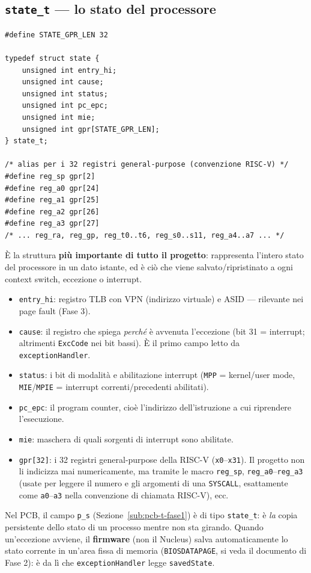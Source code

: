 \documentclass[11pt,a4paper]{article}
\newcommand{\code}[1]{\texttt{#1}}
\begin{document}
\subsection{\code{state\_t} --- lo stato del processore}
\begin{lstlisting}
#define STATE_GPR_LEN 32

typedef struct state {
    unsigned int entry_hi;
    unsigned int cause;
    unsigned int status;
    unsigned int pc_epc;
    unsigned int mie;
    unsigned int gpr[STATE_GPR_LEN];
} state_t;

/* alias per i 32 registri general-purpose (convenzione RISC-V) */
#define reg_sp gpr[2]
#define reg_a0 gpr[24]
#define reg_a1 gpr[25]
#define reg_a2 gpr[26]
#define reg_a3 gpr[27]
/* ... reg_ra, reg_gp, reg_t0..t6, reg_s0..s11, reg_a4..a7 ... */
\end{lstlisting}
\`E la struttura \textbf{più importante di tutto il progetto}: rappresenta
l'intero stato del processore in un dato istante, ed è ciò che viene
salvato/ripristinato a ogni context switch, eccezione o interrupt.
\begin{itemize}
\item \code{entry\_hi}: registro TLB con VPN (indirizzo virtuale) e ASID
  --- rilevante nei page fault (Fase 3).
\item \code{cause}: il registro che spiega \emph{perché} è avvenuta
  l'eccezione (bit 31 = interrupt; altrimenti \code{ExcCode} nei bit
  bassi). \`E il primo campo letto da \code{exceptionHandler}.
\item \code{status}: i bit di modalità e abilitazione interrupt
  (\code{MPP} = kernel/user mode, \code{MIE}/\code{MPIE} = interrupt
  correnti/precedenti abilitati).
\item \code{pc\_epc}: il program counter, cioè l'indirizzo dell'istruzione
  a cui riprendere l'esecuzione.
\item \code{mie}: maschera di quali sorgenti di interrupt sono abilitate.
\item \code{gpr[32]}: i 32 registri general-purpose della RISC-V
  (\code{x0}--\code{x31}). Il progetto non li indicizza mai numericamente,
  ma tramite le macro \code{reg\_sp}, \code{reg\_a0}--\code{reg\_a3}
  (usate per leggere il numero e gli argomenti di una \code{SYSCALL},
  esattamente come \code{a0}--\code{a3} nella convenzione di chiamata
  RISC-V), ecc.
\end{itemize}
Nel PCB, il campo \code{p\_s} (Sezione~\ref{sub:pcb-t-fase1}) è di tipo \code{state\_t}: è
\emph{la} copia persistente dello stato di un processo mentre non sta
girando. Quando un'eccezione avviene, il \textbf{firmware} (non il
Nucleus) salva automaticamente lo stato corrente in un'area fissa di
memoria (\code{BIOSDATAPAGE}, si veda il documento di Fase 2): è da lì che
\code{exceptionHandler} legge \code{savedState}.
\end{document}
